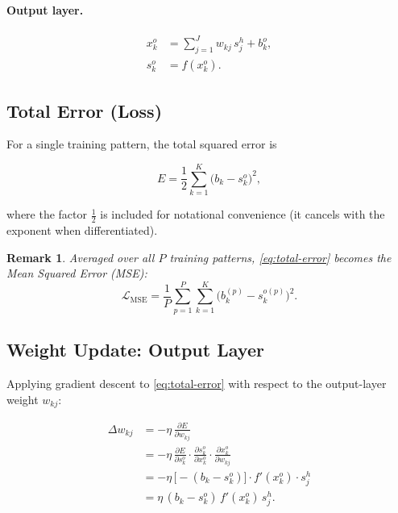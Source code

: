 \documentclass[12pt,a4paper]{article}
\newtheorem{remark}{Remark}[section]
\newcommand{\pd}[2]{\frac{\partial #1}{\partial #2}}
\newcommand{\wkj}{w_{kj}}
\newcommand{\sho}{s_{j}^{h}}
\newcommand{\sko}{s_{k}^{o}}
\newcommand{\xko}{x_{k}^{o}}
\begin{document}
\paragraph{Output layer.}
\begin{align}
  \xko &= \sum_{j=1}^{J} \wkj\,\sho + b_k^{o},
  \label{eq:output-net}\\
  \sko &= f(\xko).
  \label{eq:output-out}
\end{align}

\subsection{Total Error (Loss)}

For a single training pattern, the total squared error is

\begin{equation}
  E = \frac{1}{2}\sum_{k=1}^{K}\bigl(b_k - \sko\bigr)^{2},
  \label{eq:total-error}
\end{equation}

where the factor $\tfrac{1}{2}$ is included for notational convenience (it
cancels with the exponent when differentiated).

\begin{remark}
\label{rem:mse}
Averaged over all $P$ training patterns, \cref{eq:total-error} becomes the
Mean Squared Error (MSE):
\[
  \mathcal{L}_{\mathrm{MSE}}
  = \frac{1}{P}\sum_{p=1}^{P}\sum_{k=1}^{K}
    \bigl(b_k^{(p)} - s_k^{o(p)}\bigr)^{2}.
\]
\end{remark}

\subsection{Weight Update: Output Layer}
\label{sub:output-layer-update}

Applying gradient descent to \cref{eq:total-error} with respect to the
output-layer weight $\wkj$:

\begin{align}
  \Delta\wkj
  &= -\eta\,\pd{E}{\wkj}
  \label{eq:grad-desc}\\
  &= -\eta\,\pd{E}{\sko}\cdot\pd{\sko}{\xko}\cdot\pd{\xko}{\wkj}
  \tag{chain rule}\\
  &= -\eta\,\bigl[-(b_k - \sko)\bigr]\cdot f'(\xko)\cdot\sho
  \label{eq:output-intermediate}\\
  &= \eta\,(b_k - \sko)\,f'(\xko)\,\sho.
  \label{eq:output-update}
\end{align}
\end{document}
